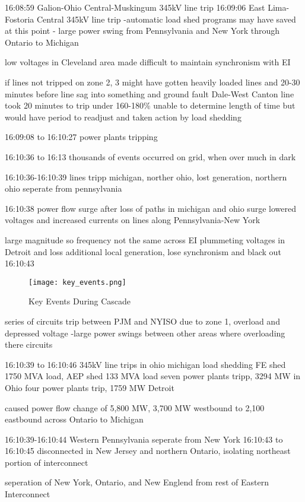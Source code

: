 16:08:59 Galion-Ohio Central-Muskingum 345kV line trip
16:09:06 East Lima-Fostoria Central 345kV line trip
-automatic load shed programs may have saved at this point
- large power swing from Pennsylvania and New York through Ontario to Michigan

low voltages in Cleveland area made difficult to maintain synchronism with EI

if lines not tripped on zone 2, 3
might have gotten heavily loaded lines and 20-30 minutes before line sag into something and ground fault
Dale-West Canton line took 20 minutes to trip under 160-180\%
unable to determine length of time
but would have period to readjust and taken action by load shedding

16:09:08 to 16:10:27 power plants tripping

16:10:36 to 16:13 thousands of events occurred on grid, when over much in dark

16:10:36-16:10:39 lines tripp michigan, norther ohio, lost generation, northern ohio seperate from pennsylvania

16:10:38 power flow surge after loss of paths in michigan and ohio
surge lowered voltages and increased currents on lines along Pennsylvania-New York

large magnitude so frequency not the same across EI
plummeting voltages in Detroit and loss additional local generation, lose synchronism and black out 16:10:43

\begin{figure}
\centering
\texttt{[image: key\_events.png]}
\caption{Key Events During Cascade}
\end{figure}

series of circuits trip between PJM and NYISO due to zone 1, overload and depressed voltage
-large power swings between other areas where overloading there circuits

16:10:39 to 16:10:46
345kV line trips in ohio michigan 
load shedding FE shed 1750 MVA load, AEP shed 133 MVA load
seven power plants tripp, 3294 MW in Ohio
four power plants trip, 1759 MW Detroit

caused power flow change of 5,800 MW, 3,700 MW westbound to 2,100 eastbound across Ontario to Michigan

16:10:39-16:10:44 Western Pennsylvania seperate from New York
16:10:43 to 16:10:45 disconnected in New Jersey and northern Ontario, isolating northeast portion of interconnect


seperation of New York, Ontario, and New Englend from rest of Eastern Interconnect

